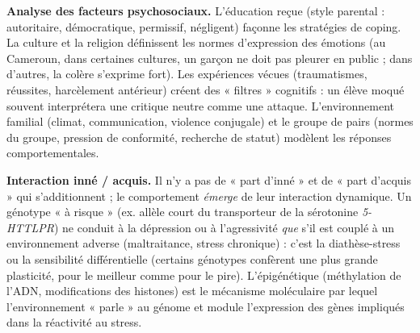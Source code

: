 \documentclass[11pt]{article}
\newcommand{\cle}[1]{{\popxbold\color{popdark}#1}}
\begin{document}
\textbf{Analyse des facteurs psychosociaux.}
L'\cle{éducation} reçue (style parental : autoritaire, démocratique, permissif, négligent) façonne les stratégies de coping. La \cle{culture} et la \cle{religion} définissent les normes d'expression des émotions (au Cameroun, dans certaines cultures, un garçon ne doit pas pleurer en public ; dans d'autres, la colère s'exprime fort). Les \cle{expériences vécues} (traumatismes, réussites, harcèlement antérieur) créent des « filtres » cognitifs : un élève moqué souvent interprétera une critique neutre comme une attaque. L'\cle{environnement familial} (climat, communication, violence conjugale) et le \cle{groupe de pairs} (normes du groupe, pression de conformité, recherche de statut) modèlent les réponses comportementales.

\textbf{Interaction inné / acquis.}
Il n'y a pas de « part d'inné » et de « part d'acquis » qui s'additionnent ; le comportement \emph{émerge} de leur interaction dynamique. Un génotype « à risque » (ex. allèle court du transporteur de la sérotonine \emph{5-HTTLPR}) ne conduit à la dépression ou à l'agressivité \emph{que} s'il est couplé à un environnement adverse (maltraitance, stress chronique) : c'est la \cle{diathèse-stress} ou la \cle{sensibilité différentielle} (certains génotypes confèrent une plus grande plasticité, pour le meilleur comme pour le pire). L'épigénétique (méthylation de l'ADN, modifications des histones) est le mécanisme moléculaire par lequel l'environnement « parle » au génome et module l'expression des gènes impliqués dans la réactivité au stress.
\end{document}
